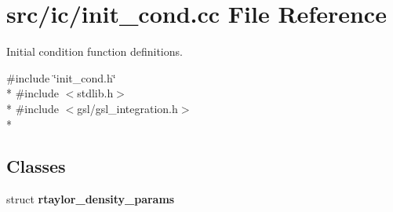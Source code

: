 \section{src/ic/init\-\_\-cond.cc File Reference}
\label{init__cond_8cc}


Initial condition function definitions.  


{\ttfamily \#include \char`\"{}init\-\_\-cond.\-h\char`\"{}}\\*
{\ttfamily \#include $<$stdlib.\-h$>$}\\*
{\ttfamily \#include $<$gsl/gsl\-\_\-integration.\-h$>$}\\*
\subsection*{Classes}
\begin{DoxyCompactItemize}
\item 
struct {\bf rtaylor\-\_\-density\-\_\-params}
\end{DoxyCompactItemize}

